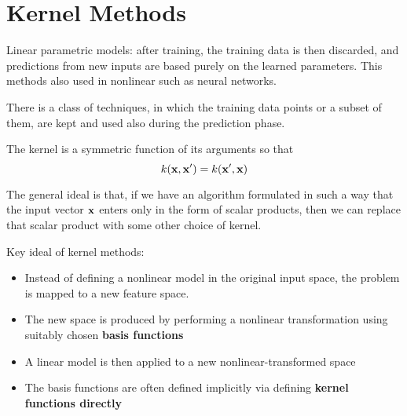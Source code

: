 \section{Kernel Methods}
Linear parametric models: after training, the training data is then
discarded, and predictions from new inputs are based purely on the learned
parameters. This methods also used in nonlinear such as neural networks.

There is a class of techniques, in which the training data points or a
subset of them, are kept and used also during the prediction phase.

The kernel is a symmetric function of its arguments so that 
\[ k(\mathbf{x}, \mathbf{x}') = k(\mathbf{x}', \mathbf{x})\]

The general ideal is that, if we have an algorithm formulated in such a
way that the input vector $\mathbf{x}$ enters only in the form of scalar
products, then we can replace that scalar product with some other choice
of kernel. 

Key ideal of kernel methods:
\begin{itemize}
    \item Instead of defining a nonlinear model in the original input
        space, the problem is mapped to a new feature space. 
    \item The new space is produced by performing a nonlinear
        transformation using suitably chosen \textbf{basis functions}
    \item A linear model is then applied to a new nonlinear-transformed
        space
    \item The basis functions are often defined implicitly via defining
        \textbf{kernel functions directly}
\end{itemize}
